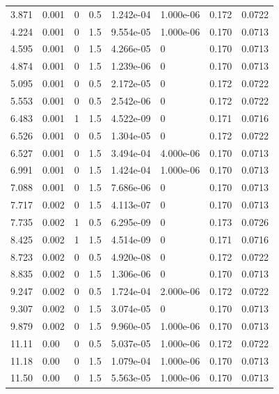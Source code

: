 \documentclass[preview]{standalone}
\begin{document}
{{\begin{tabular}{L{1.2cm}C{1.2cm} C{0.3cm}C{0.5cm} C{1.4cm}C{1.4cm} C{1.4cm}C{1.4cm}}
  3.871  &  0.001  & 0     & 0.5 &  1.242e-04  & 1.000e-06  & 0.172 &  0.0722   \\ 
  4.224  &  0.001  & 0     & 1.5 &  9.554e-05  & 1.000e-06  & 0.170 &  0.0713   \\ 
  4.595  &  0.001  & 0     & 1.5 &  4.266e-05  & 0  & 0.170 &  0.0713   \\ 
  4.874  &  0.001  & 0     & 1.5 &  1.239e-06  & 0  & 0.170 &  0.0713   \\ 
  5.095  &  0.001  & 0     & 0.5 &  2.172e-05  & 0  & 0.172 &  0.0722   \\ 
  5.553  &  0.001  & 0     & 0.5 &  2.542e-06  & 0  & 0.172 &  0.0722   \\ 
  6.483  &  0.001  & 1     & 1.5 &  4.522e-09  & 0  & 0.171 &  0.0716   \\ 
  6.526  &  0.001  & 0     & 0.5 &  1.304e-05  & 0  & 0.172 &  0.0722   \\ 
  6.527  &  0.001  & 0     & 1.5 &  3.494e-04  & 4.000e-06  & 0.170 &  0.0713   \\ 
  6.991  &  0.001  & 0     & 1.5 &  1.424e-04  & 1.000e-06  & 0.170 &  0.0713   \\ 
  7.088  &  0.001  & 0     & 1.5 &  7.686e-06  & 0  & 0.170 &  0.0713   \\ 
  7.717  &  0.002  & 0     & 1.5 &  4.113e-07  & 0  & 0.170 &  0.0713   \\ 
  7.735  &  0.002  & 1     & 0.5 &  6.295e-09  & 0  & 0.173 &  0.0726   \\ 
  8.425  &  0.002  & 1     & 1.5 &  4.514e-09  & 0  & 0.171 &  0.0716   \\ 
  8.723  &  0.002  & 0     & 0.5 &  4.920e-08  & 0  & 0.172 &  0.0722   \\ 
  8.835  &  0.002  & 0     & 1.5 &  1.306e-06  & 0  & 0.170 &  0.0713   \\ 
  9.247  &  0.002  & 0     & 0.5 &  1.724e-04  & 2.000e-06  & 0.172 &  0.0722   \\ 
  9.307  &  0.002  & 0     & 1.5 &  3.074e-05  & 0  & 0.170 &  0.0713   \\ 
  9.879  &  0.002  & 0     & 1.5 &  9.960e-05  & 1.000e-06  & 0.170 &  0.0713   \\ 
  11.11  &  0.00  & 0     & 0.5 &  5.037e-05  & 1.000e-06  & 0.172 &  0.0722   \\ 
  11.18  &  0.00  & 0     & 1.5 &  1.079e-04  & 1.000e-06  & 0.170 &  0.0713   \\ 
  11.50  &  0.00  & 0     & 1.5 &  5.563e-05  & 1.000e-06  & 0.170 &  0.0713   \\ 

\end{tabular}}}
\end{document}
